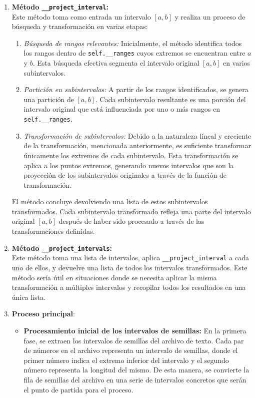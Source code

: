 \documentclass[a4paper,12pt]{article}
\begin{document}
\begin{enumerate}
    \item \textbf{Método \texttt{\_\_project\_interval}:} \\
    Este método toma como entrada un intervalo $[a, b]$ y realiza un proceso de búsqueda y transformación en varias etapas:
    \begin{enumerate}
        \item \textit{Búsqueda de rangos relevantes:} Inicialmente, el método identifica todos los rangos dentro de \lstinline{self.__ranges} cuyos extremos se encuentran entre $a$ y $b$. Esta búsqueda efectiva segmenta el intervalo original $[a, b]$ en varios subintervalos.

        \item \textit{Partición en subintervalos:} A partir de los rangos identificados, se genera una partición de $[a, b]$. Cada subintervalo resultante es una porción del intervalo original que está influenciada por uno o más rangos en \lstinline{self.__ranges}.

        \item \textit{Transformación de subintervalos:} Debido a la naturaleza lineal y creciente de la transformación, mencionada anteriormente, es suficiente transformar únicamente los extremos de cada subintervalo. Esta transformación se aplica a los puntos extremos, generando nuevos intervalos que son la proyección de los subintervalos originales a través de la función de transformación.
    \end{enumerate}
    El método concluye devolviendo una lista de estos subintervalos transformados. Cada subintervalo transformado refleja una parte del intervalo original $[a, b]$ después de haber sido procesado a través de las transformaciones definidas.

    \item \textbf{Método \texttt{\_\_project\_intervals}:} \\
    Este método toma una lista de intervalos, aplica \lstinline{__project_interval} a cada uno de ellos, y devuelve una lista de todos los intervalos transformados. Este método sería útil en situaciones donde se necesita aplicar la misma transformación a múltiples intervalos y recopilar todos los resultados en una única lista.

    \item \textbf{Proceso principal}:
    \begin{itemize}
        \item \textbf{Procesamiento inicial de los intervalos de semillas:}
        En la primera fase, se extraen los intervalos de semillas del archivo de texto. Cada par de números en el archivo representa un intervalo de semillas, donde el primer número indica el extremo inferior del intervalo y el segundo número representa la longitud del mismo. De esta manera, se convierte la fila de semillas del archivo en una serie de intervalos concretos que serán el punto de partida para el proceso.
    

\end{itemize}
\end{enumerate}
\end{document}
